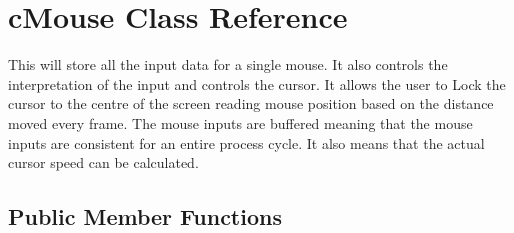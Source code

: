 \hypertarget{classc_mouse}{
\section{cMouse Class Reference}
\label{classc_mouse}
}


This will store all the input data for a single mouse. It also controls the interpretation of the input and controls the cursor. It allows the user to Lock the cursor to the centre of the screen reading mouse position based on the distance moved every frame. The mouse inputs are buffered meaning that the mouse inputs are consistent for an entire process cycle. It also means that the actual cursor speed can be calculated.  


\subsection*{Public Member Functions}
